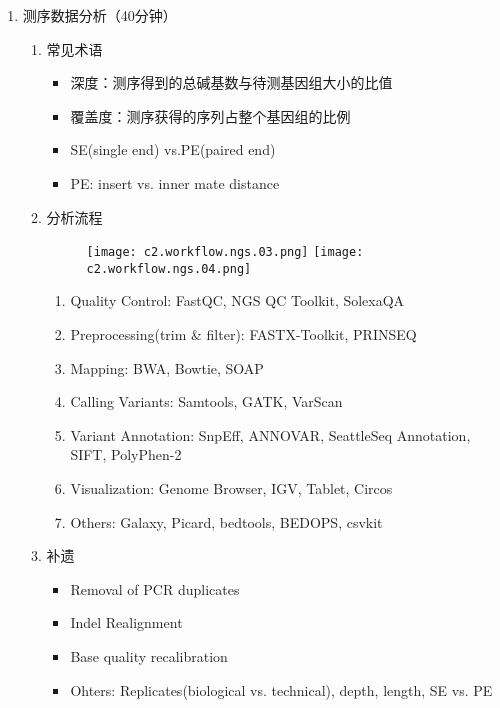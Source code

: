\documentclass{TIJMUjiaoanLL}
\begin{document}
\begin{enumerate}
  \item 测序数据分析（40分钟）
    \begin{enumerate}
      \item 常见术语
        \begin{itemize}
          \item 深度：测序得到的总碱基数与待测基因组大小的比值
          \item 覆盖度：测序获得的序列占整个基因组的比例
          \item SE(single end) vs.PE(paired end)
          \item PE: insert vs. inner mate distance
        \end{itemize}
      \item 分析流程
            \vspace{-0.5em}
            \begin{figure}[h]
              \centering
              \texttt{[image: c2.workflow.ngs.03.png]}
              \quad
              \texttt{[image: c2.workflow.ngs.04.png]}
            \end{figure}
            \vspace{-0.5em}
            \begin{enumerate}
              \item Quality Control: FastQC, NGS QC Toolkit, SolexaQA
              \item Preprocessing(trim \& filter): FASTX-Toolkit, PRINSEQ
              \item Mapping: BWA, Bowtie, SOAP
              \item Calling Variants: Samtools, GATK, VarScan
              \item Variant Annotation: SnpEff, ANNOVAR, SeattleSeq Annotation, SIFT, PolyPhen-2
              \item Visualization: Genome Browser, IGV, Tablet, Circos
              \item Others: Galaxy, Picard, bedtools, BEDOPS, csvkit
            \end{enumerate}
      \item 补遗
        \begin{itemize}
          \item Removal of PCR duplicates
          \item Indel Realignment
          \item Base quality recalibration
          \item Ohters: Replicates(biological vs. technical), depth, length, SE vs. PE
        \end{itemize}
    \end{enumerate}


\end{enumerate}
\end{document}

